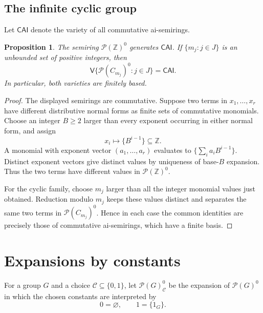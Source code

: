 \documentclass[11pt,reqno]{amsart}
\newtheorem{proposition}[theorem]{Proposition}
\theoremstyle{definition}
\numberwithin{equation}{section}
\newcommand{\Full}[1]{\mathcal{P}(#1)^0}
\newcommand{\Var}{\mathsf{V}}
\newcommand{\Z}{\mathbb{Z}}
\renewcommand{\geq}{\geqslant}
\begin{document}
\subsection{The infinite cyclic group}
Let $\mathsf{CAI}$ denote the variety of all commutative ai-semirings.

\begin{proposition}\label{prop:infinite}
The semiring $\Full{\Z}$ generates $\mathsf{CAI}$. If $\{m_j:j\in J\}$ is an unbounded set of positive integers, then
\[
 \Var\{\Full{C_{m_j}}:j\in J\}=\mathsf{CAI}.
\]
In particular, both varieties are finitely based.
\end{proposition}
\begin{proof}
The displayed semirings are commutative. Suppose two terms in $x_1,\ldots,x_r$ have different distributive normal forms as finite sets of commutative monomials. Choose an integer $B\geq 2$ larger than every exponent occurring in either normal form, and assign
\[
 x_i\longmapsto\{B^{i-1}\}\subseteq\Z.
\]
A monomial with exponent vector $(a_1,\ldots,a_r)$ evaluates to $\{\sum_i a_iB^{i-1}\}$. Distinct exponent vectors give distinct values by uniqueness of base-$B$ expansion. Thus the two terms have different values in $\Full{\Z}$.

For the cyclic family, choose $m_j$ larger than all the integer monomial values just obtained. Reduction modulo $m_j$ keeps these values distinct and separates the same two terms in $\Full{C_{m_j}}$. Hence in each case the common identities are precisely those of commutative ai-semirings, which have a finite basis.
\end{proof}

\appendix
\section{Expansions by constants}\label{app:constants}
For a group $G$ and a choice $\mathscr C\subseteq\{0,1\}$, let $\Full{G}_{\mathscr C}$ be the expansion of $\Full{G}$ in which the chosen constants are interpreted by
\[
 0=\varnothing,\qquad 1=\{1_G\}.
\]
\end{document}

